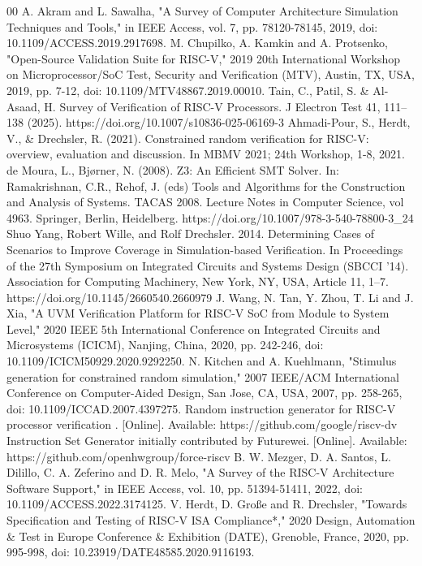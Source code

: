 \documentclass[sigconf]{acmart}
\begin{document}
\begin{thebibliography}{00}
 A. Akram and L. Sawalha, "A Survey of Computer Architecture Simulation Techniques and Tools," in IEEE Access, vol. 7, pp. 78120-78145, 2019, doi: 10.1109/ACCESS.2019.2917698.
 M. Chupilko, A. Kamkin and A. Protsenko, "Open-Source Validation Suite for RISC-V," 2019 20th International Workshop on Microprocessor/SoC Test, Security and Verification (MTV), Austin, TX, USA, 2019, pp. 7-12, doi: 10.1109/MTV48867.2019.00010.
 Tain, C., Patil, S. \& Al-Asaad, H. Survey of Verification of RISC-V Processors. J Electron Test 41, 111–138 (2025). https://doi.org/10.1007/s10836-025-06169-3
 Ahmadi-Pour, S., Herdt, V., \& Drechsler, R. (2021). Constrained random verification for RISC-V: overview, evaluation and discussion. In MBMV 2021; 24th Workshop, 1-8, 2021.
 de Moura, L., Bjørner, N. (2008). Z3: An Efficient SMT Solver. In: Ramakrishnan, C.R., Rehof, J. (eds) Tools and Algorithms for the Construction and Analysis of Systems. TACAS 2008. Lecture Notes in Computer Science, vol 4963. Springer, Berlin, Heidelberg. https://doi.org/10.1007/978-3-540-78800-3\_24
 Shuo Yang, Robert Wille, and Rolf Drechsler. 2014. Determining Cases of Scenarios to Improve Coverage in Simulation-based Verification. In Proceedings of the 27th Symposium on Integrated Circuits and Systems Design (SBCCI '14). Association for Computing Machinery, New York, NY, USA, Article 11, 1–7. https://doi.org/10.1145/2660540.2660979
 J. Wang, N. Tan, Y. Zhou, T. Li and J. Xia, "A UVM Verification Platform for RISC-V SoC from Module to System Level," 2020 IEEE 5th International Conference on Integrated Circuits and Microsystems (ICICM), Nanjing, China, 2020, pp. 242-246, doi: 10.1109/ICICM50929.2020.9292250.
 N. Kitchen and A. Kuehlmann, "Stimulus generation for constrained random simulation," 2007 IEEE/ACM International Conference on Computer-Aided Design, San Jose, CA, USA, 2007, pp. 258-265, doi: 10.1109/ICCAD.2007.4397275.
 Random instruction generator for RISC-V processor verification . [Online]. Available: https://github.com/google/riscv-dv
 Instruction Set Generator initially contributed by Futurewei. [Online]. Available: https://github.com/openhwgroup/force-riscv
 B. W. Mezger, D. A. Santos, L. Dilillo, C. A. Zeferino and D. R. Melo, "A Survey of the RISC-V Architecture Software Support," in IEEE Access, vol. 10, pp. 51394-51411, 2022, doi: 10.1109/ACCESS.2022.3174125. 
 V. Herdt, D. Große and R. Drechsler, "Towards Specification and Testing of RISC-V ISA Compliance*," 2020 Design, Automation \& Test in Europe Conference \& Exhibition (DATE), Grenoble, France, 2020, pp. 995-998, doi: 10.23919/DATE48585.2020.9116193.

\end{thebibliography}
\end{document}
